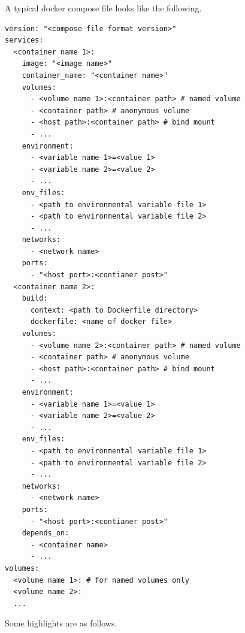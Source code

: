 A typical docker compose file looks like the following.

\begin{lstlisting}
version: "<compose file format version>"
services:
  <container name 1>:
    image: "<image name>"
    container_name: "<container name>"
    volumes:
      - <volume name 1>:<container path> # named volume
      - <container path> # anonymous volume
      - <host path>:<container path> # bind mount
      - ...
    environment:
      - <variable name 1>=<value 1>
      - <variable name 2>=<value 2>
      - ...
    env_files:
      - <path to environmental variable file 1>
      - <path to environmental variable file 2>
      - ...
    networks:
      - <network name>
    ports:
      - "<host port>:<contianer post>"
  <container name 2>:
    build:
      context: <path to Dockerfile directory>
      dockerfile: <name of docker file>
    volumes:
      - <volume name 2>:<container path> # named volume
      - <container path> # anonymous volume
      - <host path>:<container path> # bind mount
      - ...
    environment:
      - <variable name 1>=<value 1>
      - <variable name 2>=<value 2>
      - ...
    env_files:
      - <path to environmental variable file 1>
      - <path to environmental variable file 2>
      - ...
    networks:
      - <network name>
    ports:
      - "<host port>:<contianer post>"
    depends_on:
      - <container name>
      - ...
volumes:
  <volume name 1>: # for named volumes only
  <volume name 2>:
  ...
\end{lstlisting}
Some highlights are as follows.
